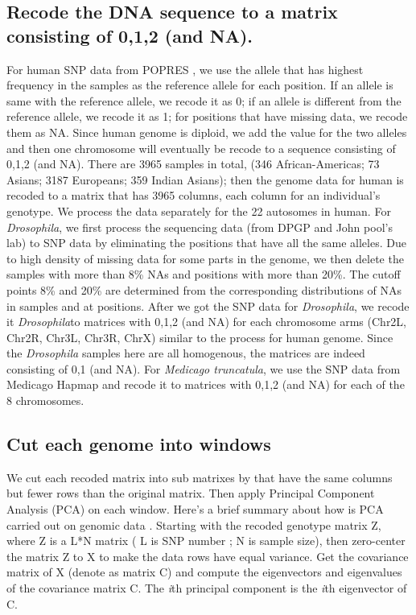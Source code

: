 \documentclass[11pt, oneside]{article}   	%
\begin{document}
\subsection{Recode the DNA sequence to a matrix consisting of 0,1,2 (and NA).}
For human SNP data from POPRES \citet{nelson2008population}, we use the allele that has highest frequency in the samples as the reference allele for each position. If an allele is same with the reference allele, we recode it as 0; if an allele is different from the reference allele, we recode it as 1; for positions that have missing data, we recode them as NA. Since human genome is diploid, we add the value for the two alleles and then one chromosome will eventually be recode to a sequence consisting of 0,1,2 (and NA). There are 3965 samples in total, (346 African-Americas; 73 Asians; 3187 Europeans; 359 Indian Asians); then the genome data for human is recoded to a matrix that has 3965 columns, each column for an individual's genotype. We process the data separately for the 22 autosomes in human. For \textit{Drosophila}, we first process the sequencing data (from DPGP and John pool's lab) to SNP data by eliminating the positions that have all the same alleles. Due to high density of missing data for some parts in the genome, we then delete the samples with more than 8\% NAs and positions with more than 20\%. The cutoff points 8\% and 20\% are determined from the corresponding distributions of NAs in samples and at positions. After we got the SNP data for \textit{Drosophila}, we recode it \textit{Drosophila}to matrices with 0,1,2 (and NA) for each chromosome arms (Chr2L, Chr2R, Chr3L, Chr3R, ChrX) similar to the process for human genome. Since the \textit{Drosophila} samples here are all homogenous, the matrices are indeed consisting of 0,1 (and NA). For \textit{Medicago truncatula}, we use the SNP data from Medicago Hapmap and recode it to matrices with 0,1,2 (and NA) for each of the 8 chromosomes.

\subsection{Cut each genome into windows}
We cut each recoded matrix into sub matrixes by that have the same columns but fewer rows than the original matrix. Then apply Principal Component Analysis (PCA) on each window. Here's a brief summary about how is PCA carried out on genomic data \citep{mcvean2009genealogical}. Starting with the recoded genotype matrix Z, where Z is a L*N matrix ( L is SNP number ; N is sample size), then zero-center the matrix Z to X to make the data rows have equal variance. Get the covariance matrix of X (denote as matrix C) and compute the eigenvectors and eigenvalues of the covariance matrix C. The \textit{i}th principal component is the \textit{i}th eigenvector of C.
\end{document}

